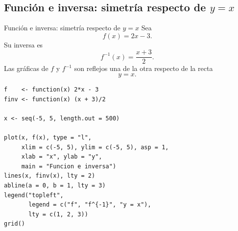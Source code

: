 \documentclass[aspectratio=169,10pt]{beamer}
\begin{document}
\subsection{Función e inversa: simetría respecto de $y=x$}
\begin{frame}{Función e inversa: simetría respecto de $y=x$}
Sea
\[
f(x)=2x-3.
\]
Su inversa es
\[
f^{-1}(x)=\frac{x+3}{2}.
\]
Las gráficas de $f$ y $f^{-1}$ son reflejos una de la otra respecto de la
recta
\[
y=x.
\]

\begin{center}
\end{center}

\begin{verbatim}
f    <- function(x) 2*x - 3
finv <- function(x) (x + 3)/2

x <- seq(-5, 5, length.out = 500)

plot(x, f(x), type = "l",
     xlim = c(-5, 5), ylim = c(-5, 5), asp = 1,
     xlab = "x", ylab = "y",
     main = "Funcion e inversa")
lines(x, finv(x), lty = 2)
abline(a = 0, b = 1, lty = 3)
legend("topleft",
       legend = c("f", "f^{-1}", "y = x"),
       lty = c(1, 2, 3))
grid()
\end{verbatim}

\end{frame}
\end{document}
